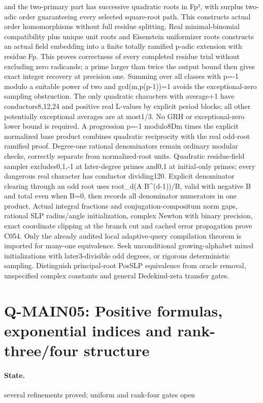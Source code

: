 and the two-primary part has successive quadratic roots in Fp², with surplus two-adic order guaranteeing every selected square-root path. This constructs actual order homomorphisms without full residue splitting. Real minimal-binomial compatibility plus unique unit roots and Eisenstein uniformizer roots constructs an actual field embedding into a finite totally ramified p-adic extension with residue Fp. This proves correctness of every completed residue trial without excluding zero radicands; a prime larger than twice the output bound then gives exact integer recovery at precision one. Summing over all classes with p=-1 modulo a suitable power of two and gcd(m,p(p-1))=1 avoids the exceptional-zero sampling obstruction. The only quadratic characters with average+1 have conductors8,12,24 and positive real L-values by explicit period blocks; all other potentially exceptional averages are at most1/3. No GRH or exceptional-zero lower bound is required. A progression p=-1 modulo8Dm times the explicit normalized base product combines quadratic reciprocity with the real odd-root ramified proof. Degree-one rational denominators remain ordinary modular checks, correctly separate from normalized-root units. Quadratic residue-field sampler excludes0,1,-1 at later-degree primes and0,1 at initial-only primes; every dangerous real character has conductor dividing120. Explicit denominator clearing through an odd root uses root\_d(A B\textasciicircum{}(d-1))/B, valid with negative B and total even when B=0, then records all denominator numerators in one product. Actual integral fractions and conjugation-compositum norm gaps, rational SLP radius/angle initialization, complex Newton with binary precision, exact coordinate clipping at the branch cut and cached error propagation prove C054. Only the already audited local adaptive-query compilation theorem is imported for many-one equivalence. Seek unconditional growing-alphabet mixed initializations with later3-divisible odd degrees, or rigorous deterministic sampling. Distinguish principal-root PosSLP equivalence from oracle removal, unspecified complex constants and general Dedekind-zeta transfer gates.

\section{Q-MAIN05: Positive formulas, exponential indices and rank-three/four structure}
\paragraph{State.} several refinements proved; uniform and rank-four gates open
